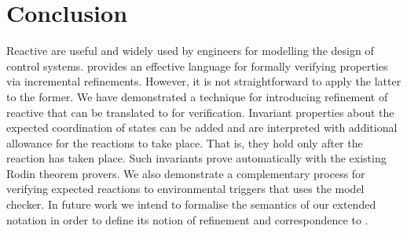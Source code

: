 \section{Conclusion}
\label{sec:conc}

Reactive \SCs are useful and widely used by engineers for modelling the design of control systems. 
\EventB provides an effective language for formally verifying properties via incremental refinements.
However, it is not straightforward to apply the latter to the former.
We have demonstrated a technique for introducing refinement of reactive \SCs that can be translated to \EventB for verification.
Invariant properties about the expected coordination of states can be added and are interpreted with additional allowance for the reactions to take place.
That is, they hold only after the reaction has taken place.
Such invariants prove automatically with the existing Rodin theorem provers.
We also demonstrate a complementary process for verifying expected reactions to environmental triggers that uses the \LTL model checker.
In future work we intend to formalise the semantics of our extended \SCXML notation in order to define its notion of refinement and correspondence to \EventB. 



